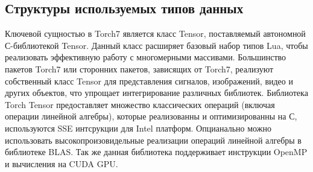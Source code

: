 \documentclass[a4paper,english,russian]{G2-105}
\begin{document}
\subsection{Структуры используемых типов данных}
\par Ключевой сущностью в Torch7 является класс Tensor, поставляемый автономной С-библиотекой Tensor. Данный класс расширяет базовый набор типов Lua, чтобы реализовать эффективную работу с многомерными массивами. Большинство пакетов Torch7 или сторонних пакетов, зависящих от Torch7, реализуют собственный класс Tensor для представления сигналов, изображений, видео и других объектов, что упрощает интегрирование различных библиотек. Библиотека Torch Tensor предоставляет множество классических операций (включая операции линейной алгебры), которые реализованны и оптимизированны на С, используются SSE интсрукции для Intel платформ. Опцианально можно использовать высокопроизовидельные реализации операций линейной алгебры в библиотеке BLAS. Так же данная библиотека поддерживает инструкции OpenMP и вычисления на CUDA GPU.
\ttl
\end{document}
